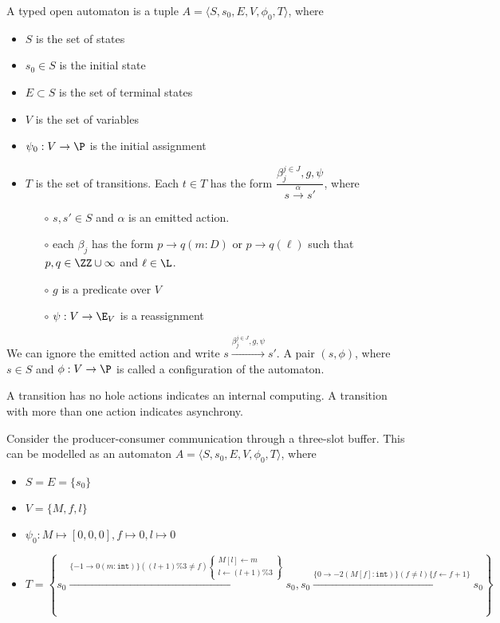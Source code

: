 \begin{definition} A typed open automaton is a tuple $A=\langle S, s_0, E, V, \phi_0, T\rangle$, where
  \begin{itemize}
    \item $S$ is the set of states
    \item $s_0\in S$ is the initial state
    \item $E\subset S$ is the set of terminal states
    \item $V$ is the set of variables
    \item $\psi_0: V\to\P$ is the initial assignment
    \item $T$ is the set of transitions. Each $t\in T$ has the form $\dfrac{\beta_{j}^{j\in J}, g, \psi}{s\xrightarrow{\alpha}s'}$, where
          \begin{itemize}
            \item [$\circ$]$s,s'\in S$ and $\alpha$ is an emitted action.
            \item [$\circ$] each $\beta_{j}$ has the form $p\to q(m : D)$ or $p\to q(\ell)$ such that $p,q\in \ZZ\cup\infty$ and $\ell\in\L$.
            \item [$\circ$] $g$ is a predicate over $V$
            \item [$\circ$] $\psi: V\to \E_V$ is a reassignment
          \end{itemize}
  \end{itemize}
  We can ignore the emitted action and write $s\xrightarrow{\beta_{j}^{j\in J}, g, \psi}s'$. A pair $(s, \phi)$, where $s\in S$ and $\phi:V\to\P$ is called a configuration of the automaton.
\end{definition}

\begin{remark}
  A transition has no hole actions indicates an internal computing. A transition with more than one action indicates asynchrony.
\end{remark}

\begin{example}
  Consider the producer-consumer communication through a three-slot buffer. This can be modelled as an automaton $A=\langle S, s_0, E, V, \phi_0, T\rangle$, where
  \begin{itemize}
    \item $S=E=\{s_0\}$
    \item $V=\{M, f, l\}$
    \item $\psi_0: M\mapsto [0,0,0], f\mapsto 0, l\mapsto 0$
    \item $T = \left\{s_0\xrightarrow{\{-1\to 0 (m:\texttt{int})\}((l+1)\% 3 \ne f)\left\{\substack{M[l]\leftarrow m \\ l\leftarrow (l+1)\% 3}\right\}}s_0, s_0\xrightarrow{\{0\to -2 (M[f]:\texttt{int})\}(f \ne l)\{f\leftarrow f+1\}}s_0\right\}$
  \end{itemize}
  \label{example:prod-con}
\end{example}


